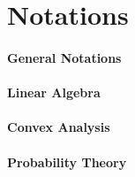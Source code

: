 \section{Notations}
\label{sec:ch1-notations}

\paragraph{General Notations}


\paragraph{Linear Algebra}

\paragraph{Convex Analysis}


\paragraph{Probability Theory}
